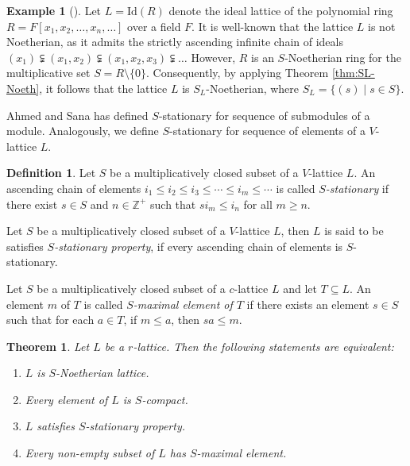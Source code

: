 \documentclass[10pt,twoside,a4]{amsart}
\numberwithin{equation}{section}
\theoremstyle{plain}
\newtheorem{thm}[lem]{Theorem}
\theoremstyle{definition}
\newtheorem{exa}[lem]{Example}
\newtheorem{defn}[lem]{Definition}
\begin{document}
\begin{exa}[\cite{SAK}]Let $L = \mathrm{Id}(R)$ denote the ideal lattice of the polynomial ring $R = F[x_1, x_2, \dots, x_n, \dots]$ over a field $F$. It is well-known that the lattice $L$ is not Noetherian, as it admits the strictly ascending infinite chain of ideals $(x_1) \subsetneqq (x_1, x_2) \subsetneqq (x_1, x_2, x_3) \subsetneqq \dots $ However, $R$ is an $S$-Noetherian ring for the multiplicative set $S = R \setminus \{0\}$. Consequently, by applying Theorem \ref{thm:SL-Noeth}, it follows that the lattice $L$ is $S_L$-Noetherian, where $S_L = \{ (s) \mid s \in S \}$.\end{exa}



Ahmed and Sana \cite{HH} has defined $S$-stationary for sequence of submodules of a module. Analogously, we define $S$-stationary for sequence of elements of a $V$-lattice $L$.

\begin{defn}
	Let $S$ be a multiplicatively closed subset of a $V$-lattice $L$. An ascending chain of elements $i_1 \leq i_2 \leq i_3 \leq \cdots \leq i_m  \leq \cdots $ is called \textit{$S$-stationary} if there exist $s \in S$ and $ n \in \mathbb{Z}^{+}$ such that $s  i_m \leq i_n$ for all $m \geq n$. 


Let $S$ be a multiplicatively closed subset of a $V$-lattice $L$, then  $L$ is said to be satisfies \textit{$S$-stationary property}, if every ascending chain of elements is $S$-stationary.

	Let $S$ be a multiplicatively closed subset of a $c$-lattice $L$ and let $T\subseteq L$. An element $m$ of $T$ is called \textit{$S$-maximal element of $T$} if there exists an element $s\in S$ such that for each $a\in T$, if $m\leq a$, then $sa\leq m$.	
\end{defn}

\begin{thm} \label{5.11a.}
	Let $L$ be a $r$-lattice. Then the following statements are equivalent:
	
	\begin{enumerate}
		\item $L$ is $S$-Noetherian lattice.
		
		\item Every element of $L$ is $S$-compact. 
		
		\item $L$  satisfies $S$-stationary property. 
		\item\label{S-MC} Every non-empty subset of $L$ has $S$-maximal element.
	\end{enumerate}
\end{thm}
\end{document}

